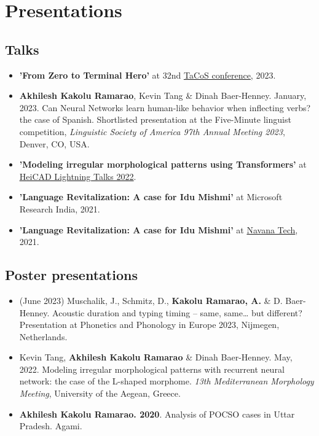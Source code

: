 \documentclass[11pt,a4paper,sans]{moderncv}
\begin{document}
\section{Presentations}

\subsection{Talks}
    \begin{itemize}
        \item \textbf{'From Zero to Terminal Hero'} at 32nd \href{https://tacosconference.github.io/agenda}{\underline{TaCoS conference}}, 2023.
        \item \textbf{Akhilesh Kakolu Ramarao}, Kevin Tang \& Dinah Baer-Henney. January, 2023. Can Neural Networks learn human-like behavior when inflecting verbs? the case of Spanish. Shortlisted presentation at the Five-Minute linguist competition, \textit{Linguistic Society of America 97th Annual Meeting 2023}, Denver,
CO, USA.
        \item \textbf{'Modeling irregular morphological patterns using Transformers'} at  \underline{\href{https://www.heicad.hhu.de/aktivitaeten/lightning-talks-2022}{HeiCAD Lightning Talks 2022}}.
        \item \textbf{'Language Revitalization: A case for Idu Mishmi'} at Microsoft Research India, 2021.
        \item \textbf{'Language Revitalization: A case for Idu Mishmi'} at \href{https://www.navana.ai/}{Navana Tech}, 2021.
    \end{itemize}

\subsection{Poster presentations}
    \begin{itemize}
        \item (June 2023) Muschalik, J., Schmitz, D., \textbf{Kakolu Ramarao, A.} \& D. Baer-Henney. Acoustic duration and typing timing – same, same… but different? Presentation at Phonetics and Phonology in Europe 2023, Nijmegen, Netherlands.
        \item Kevin Tang, \textbf{Akhilesh Kakolu Ramarao} \& Dinah Baer-Henney. May, 2022. Modeling irregular morphological patterns with recurrent neural network: the case of the L-shaped morphome. \textit{13th Mediterranean Morphology Meeting}, University of the Aegean, Greece.
        \item \textbf{Akhilesh Kakolu Ramarao. 2020}. Analysis of POCSO cases in Uttar Pradesh. Agami.
    \end{itemize}
\end{document}
